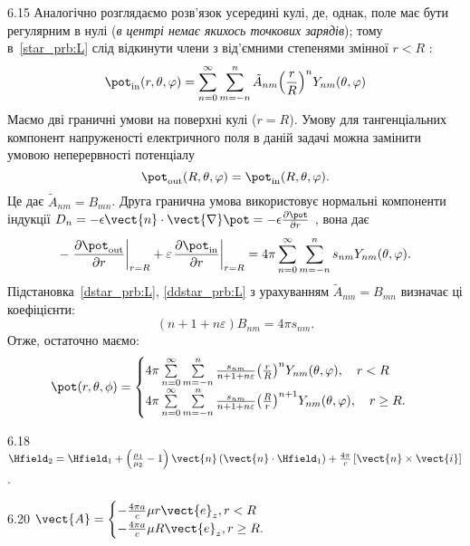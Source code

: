 \begin{Solution}{6.{15}}
	Аналогічно розглядаємо розв’язок усередині кулі, де, однак, поле має бути регулярним в нулі (\emph{в центрі немає якихось точкових зарядів}); тому в~\eqref{star_prb:L} слід відкинути члени з від'ємними степенями змінної $r < R$ :
	\begin{equation}\label{ddstar_prb:L}
		\pot_\mathrm{in}(r,\theta ,\varphi ) = \sum\limits_{n = 0}^\infty  {\sum\limits_{m =  - n}^n {{{\tilde A}_{nm}}{{\left( {\frac{r}{R}} \right)}^n}{Y_{nm}}(\theta ,\varphi )} }
	\end{equation}
	Маємо дві граничні умови на поверхні кулі ($r = R$). Умову для тангенціальних компонент напруженості електричного поля в даній задачі можна замінити умовою неперервності потенціалу
	\[
		\pot_\mathrm{out}(R,\theta ,\varphi ) = {\pot_\mathrm{in}}(R,\theta ,\varphi ).
	\]
	Це дає  $\tilde{A}_{nm} = B_{mn}$.
	Друга гранична умова використовує нормальні компоненти індукції $D_n =  - \epsilon \vect{n} \cdot \vect{\nabla}\pot  =  - \epsilon \frac{\partial \pot }{\partial r}$ , вона дає
	\[
		- \left. {\frac{{\partial {\pot_\mathrm{out}}}}{{\partial r}}} \right|_{r = R} + \varepsilon {\left. {\frac{{\partial {\pot_\mathrm{in}}}}{{\partial r}}} \right|_{r = R}} = 4\pi \sum\limits_{n = 0}^\infty  {\sum\limits_{m =  - n}^n {{s_{nm}}{Y_{nm}}(\theta ,\varphi )} }.
	\]
	Підстановка~\eqref{dstar_prb:L}, \eqref{ddstar_prb:L} з урахуванням  $\tilde{A}_{nm} = B_{mn}$ визначає ці коефіцієнти:
	\[
		\left( n + 1 + n\varepsilon  \right)B_{nm} = 4\pi s_{nm}.
	\]
	Отже, остаточно маємо:
	\[
		\pot(r,\theta,\phi) =
		\begin{cases}
			4\pi \sum\limits_{n = 0}^\infty  {\sum\limits_{m =  - n}^n {\frac{{{s_{nm}}}}{{n + 1 + n\varepsilon }}{{\left( {\frac{r}{R}} \right)}^n}{Y_{nm}}(\theta ,\varphi )} } , \quad r < R \\
			4\pi \sum\limits_{n = 0}^\infty  {\sum\limits_{m =  - n}^n {\frac{{{s_{nm}}}}{{n + 1 + n\varepsilon }}{{\left( {\frac{R}{r}} \right)}^{n + 1}}{Y_{nm}}(\theta ,\varphi )} } , \quad r \ge R.
		\end{cases}
	\]

\end{Solution}
\begin{Solution}{6.{18}}
    $\Hfield_2 = \Hfield_1 + \left( \frac{\mu_1}{\mu_2} - 1 \right)\vect{n}\left( \vect{n} \cdot \Hfield_1 \right) + \frac{4\pi}{c}\left[\vect{n}\times\vect{i}\right] $.
\end{Solution}
\begin{Solution}{6.{20}}
	$\vect{A} =
		\begin{cases}
			-\frac{4\pi a}{c}\mu r \vect{e}_z, r < R \\
			-\frac{4\pi a}{c}\mu R \vect{e}_z, r \ge R.
		\end{cases}
	$
\end{Solution}
